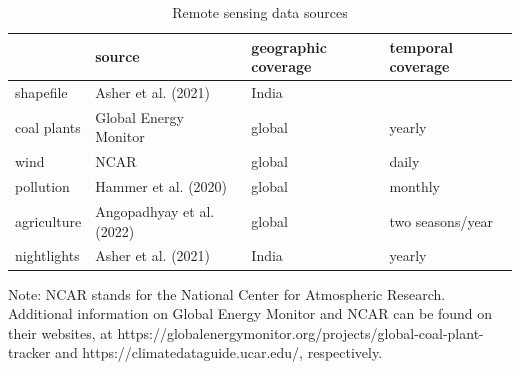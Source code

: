 \documentclass[
]{article}
\begin{document}
\setcounter{table}{0} \renewcommand{\thetable}{A\arabic{table}} \setcounter{figure}{0} \renewcommand{\thefigure}{A\arabic{figure}} 
\FloatBarrier

\begin{table}[H]

\caption{\label{tab:data}Remote sensing data sources}
\centering
\begin{threeparttable}
\begin{tabular}[t]{>{\raggedright\arraybackslash}p{2cm}>{\centering\arraybackslash}p{4.5cm}>{\centering\arraybackslash}p{3.5cm}>{\centering\arraybackslash}p{3.5cm}}
\toprule
  & source & geographic coverage & temporal coverage\\
\midrule
shapefile & Asher et al. (2021) & India & \\
coal plants & Global Energy Monitor & global & yearly\\
wind & NCAR & global & daily\\
pollution & Hammer et al. (2020) & global & monthly\\
agriculture & Angopadhyay et al. (2022) & global & two seasons/year\\
nightlights & Asher et al. (2021) & India & yearly\\
\bottomrule
\end{tabular}
\begin{tablenotes}
\item Note: NCAR stands for the National Center for Atmospheric Research. Additional information on Global Energy Monitor and NCAR can be found on their websites, at https://globalenergymonitor.org/projects/global-coal-plant-tracker and https://climatedataguide.ucar.edu/, respectively.
\end{tablenotes}
\end{threeparttable}
\end{table}
\end{document}
